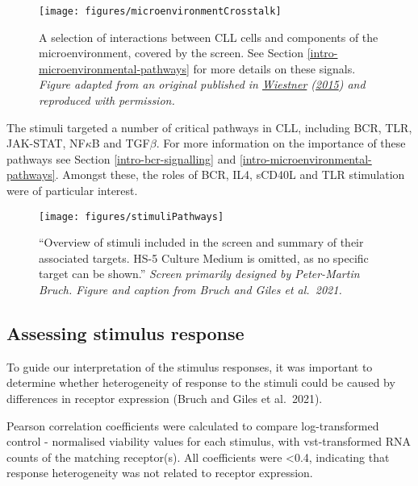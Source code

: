 \documentclass[11pt, a4paper, twosided]{book}
\begin{document}
\begin{figure}

{\centering \texttt{[image: figures/microenvironmentCrosstalk]} 

}

\caption{A selection of interactions between CLL cells and components of the microenvironment, covered by the screen. See Section \ref{intro-microenvironmental-pathways} for more details on these signals. \emph{Figure adapted from an original published in \protect\hyperlink{ref-Wiestner2015}{Wiestner} (\protect\hyperlink{ref-Wiestner2015}{2015}) and reproduced with permission.}}\label{fig:microenvironmentCrosstalk}
\end{figure}
The stimuli targeted a number of critical pathways in CLL, including BCR, TLR, JAK-STAT, NF\(\kappa\)B and TGF\(\beta\). For more information on the importance of these pathways see Section \ref{intro-bcr-signalling} and \ref{intro-microenvironmental-pathways}. Amongst these, the roles of BCR, IL4, sCD40L and TLR stimulation were of particular interest.


\begin{figure}

{\centering \texttt{[image: figures/stimuliPathways]} 

}

\caption{``Overview of stimuli included in the screen and summary of their associated targets. HS-5 Culture Medium is omitted, as no specific target can be shown.'' \emph{Screen primarily designed by Peter-Martin Bruch. Figure and caption from Bruch and Giles et al.~2021.}}\label{fig:stimuliPathways}
\end{figure}
\hypertarget{rna-correlations}{%
\subsection{Assessing stimulus response}\label{rna-correlations}}

To guide our interpretation of the stimulus responses, it was important to determine whether heterogeneity of response to the stimuli could be caused by differences in receptor expression (Bruch and Giles et al.~2021).

Pearson correlation coefficients were calculated to compare log-transformed control - normalised viability values for each stimulus, with vst-transformed RNA counts of the matching receptor(s). All coefficients were \textless0.4, indicating that response heterogeneity was not related to receptor expression.
\end{document}
